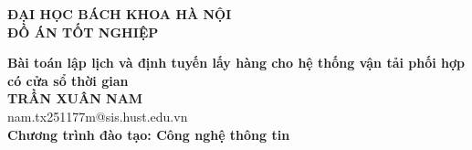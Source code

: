 \documentclass[DoAn.tex]{subfiles}
\begin{document}
\begin{titlepage}
\thispagestyle{empty}
\begin{center}

{\textbf{\large{ĐẠI HỌC BÁCH KHOA HÀ NỘI}}}\\[4cm]

{\textbf{\huge{ ĐỒ ÁN TỐT NGHIỆP}}}\\[1cm]
{\textbf{\Large{Bài toán lập lịch và định tuyến lấy hàng cho hệ thống vận tải phối hợp
có cửa sổ thời gian }}\\[1cm]

{\textbf{\large{TRẦN XUÂN NAM}}}\\
{\large{nam.tx251177m@sis.hust.edu.vn}}\\[0.5cm]

{\textbf{\large{Chương trình đào tạo: Công nghệ thông tin}}}%

\vspace{4cm}
\begin{table}[H]
\centering
{}
\end{table}}
\end{center}



\end{titlepage}
\end{document}
